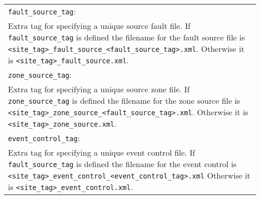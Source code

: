 \vspace{2em}
\begin{tabular}{|p{\textwidth}|}
\hline \vspace{0.1em} \texttt{fault\_source\_tag}: \\
Extra tag for specifying a unique source fault file. 
If  \texttt{fault\_source\_tag} is defined the
filename for the fault source file is
\texttt{<site\_tag>\_fault\_source\_<fault\_source\_tag>.xml}.
Otherwise it is \texttt{<site\_tag>\_fault\_source.xml}.
\\
\hline \vspace{0.1em} \texttt{zone\_source\_tag}: \\
Extra tag for specifying a unique source zone file. 
If  \texttt{zone\_source\_tag} is defined the
filename for the zone source file is
\texttt{<site\_tag>\_zone\_source\_<fault\_source\_tag>.xml}.
Otherwise it is \texttt{<site\_tag>\_zone\_source.xml}.
\\
\hline \vspace{0.1em} \texttt{event\_control\_tag}: \\
Extra tag for specifying a unique event control file.
If  \texttt{fault\_source\_tag} is defined the
filename for the event control is
\texttt{<site\_tag>\_}\texttt{event\_control\_}\texttt{<event\_control\_tag>}\texttt{.xml}
Otherwise it is \texttt{<site\_tag>\_event\_control.xml}.
\\
\hline
 \end{tabular}

